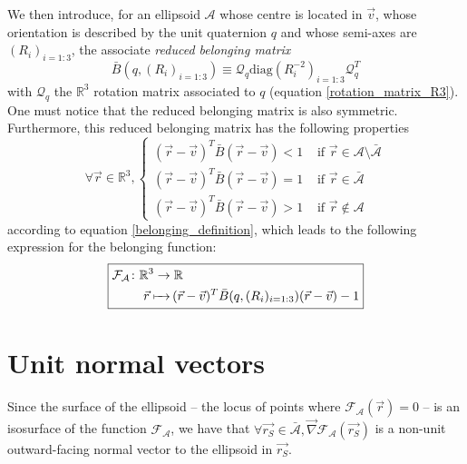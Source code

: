 \documentclass[class=report, float=false, crop=false]{standalone}
\begin{document}
We then introduce, for an ellipsoid $\mathcal{A}$ whose centre is located in $\vec{v}$, whose orientation is described by the unit quaternion $q$ and whose semi-axes are $(R_i)_{i=1:3}$, the associate \textit{reduced belonging matrix}
\begin{equation}
\boxed{\bar{B}(q,(R_i)_{i=1:3}) \equiv \mathcal{Q}_q\text{diag}(R_i^{-2})_{i=1:3}\mathcal{Q}_q^T}
\label{reduced_belonging_matrix}
\end{equation}
with $\mathcal{Q}_q$ the $\mathbb{R}^3$ rotation matrix associated to $q$ (equation \ref{rotation_matrix_R3}). One must notice that the reduced belonging matrix is also symmetric. Furthermore, this reduced belonging matrix has the following properties
\begin{equation}
\forall \vec{r} \in \mathbb{R}^3, \begin{cases} (\vec{r} - \vec{v})^T \bar{B} (\vec{r} - \vec{v}) < 1 &\text{ if } \vec{r} \in \mathcal{A} \setminus \bar{\mathcal{A}} \\ (\vec{r} - \vec{v})^T \bar{B} (\vec{r} - \vec{v}) = 1 &\text{ if } \vec{r} \in \bar{\mathcal{A}} \\ (\vec{r} - \vec{v})^T \bar{B} (\vec{r} - \vec{v}) > 1 &\text{ if } \vec{r} \notin \mathcal{A} \end{cases}
\label{reduced_belonging_definition}
\end{equation}
according to equation \ref{belonging_definition}, which leads to the following expression for the belonging function:
\begin{equation}
\boxed{\begin{aligned}\mathcal{F}_{\mathcal{A}} \colon &\mathbb{R}^3 \to \mathbb{R}\\     &\phantomarrow{\mathbb{R}^3}{\vec{r}} (\vec{r} - \vec{v})^T\bar{B}(q,(R_i)_{i=1:3})(\vec{r}-\vec{v}) - 1\end{aligned}}
\label{belonging_function_reduced}
\end{equation}

\section{Unit normal vectors}

Since the surface of the ellipsoid -- the locus of points where $\mathcal{F}_{\mathcal{A}}(\vec{r}) = 0$ -- is an isosurface of the function $\mathcal{F}_{\mathcal{A}}$, we have that $\forall \vec{r_S} \in \bar{\mathcal{A}}, \vec{\nabla}\mathcal{F}_{\mathcal{A}}(\vec{r_S})$ is a non-unit outward-facing normal vector to the ellipsoid in $\vec{r_S}$.\\
\end{document}
